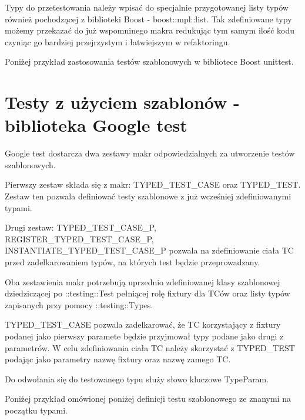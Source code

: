 \documentclass[12pt,a4paper,notitlepage]{report}
\begin{document}
Typy do przetestowania należy wpisać do specjalnie przygotowanej listy typów również pochodzącej z biblioteki Boost - boost::mpl::list. Tak zdefiniowane typy możemy przekazać do już wspomninego makra redukując tym samym ilość kodu czyniąc go bardziej przejrzystym i łatwiejszym w refaktoringu.

Poniżej przykład zastosowania testów szablonowych w bibliotece Boost unittest.

			

\section{Testy z użyciem szablonów - biblioteka Google test}

Google test dostarcza dwa zestawy makr odpowiedzialnych za utworzenie testów szablonowych.

Pierwszy zestaw składa się z makr: TYPED{\_}TEST{\_}CASE oraz TYPED{\_}TEST. Zestaw ten pozwala definiować testy szablonowe z już wcześniej zdefiniowanymi typami.

Drugi zestaw: TYPED{\_}TEST{\_}CASE{\_}P, REGISTER{\_}TYPED{\_}TEST{\_}CASE{\_}P, INSTANTIATE{\_}TYPED{\_}TEST{\_}CASE{\_}P pozwala na zdefiniowanie ciała TC przed zadelkarowaniem typów, na których test będzie przeprowadzany.

Oba zestawienia makr potrzebują uprzednio zdefiniowanej klasy szablonowej dziedziczącej po ::testing::Test pełniącej rolę fixtury dla TCów oraz listy typów zapisanych przy pomocy ::testing::Types.

TYPED{\_}TEST{\_}CASE pozwala zadelkarować, że TC korzystający z fixtury podanej jako pierwszy paramete będzie przyjmował typy podane jako drugi z parametrów. W celu zdefiniowania ciała TC należy skorzystać z TYPED{\_}TEST podając jako parametry nazwę fixtury oraz nazwę zamego TC.

Do odwołania się do testowanego typu służy słowo kluczowe TypeParam.

Poniżej przykład omówionej poniżej definicji testu szablonowego ze znanymi na początku typami.

			
\end{document}
